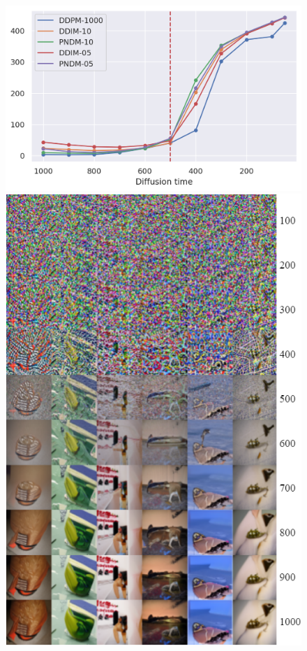 \documentclass{article}
\begin{document}
\begin{figure}[ht!]
\begin{minipage}[b]{.34\textwidth}
\begin{minipage}[b]{\textwidth}
  \end{minipage} \vfill
  \begin{minipage}[b]{\textwidth}
    \centering
    \includegraphics[width=\textwidth]{figs/plots/celeba64_late_starts_.png}
  \end{minipage}
\end{minipage}%
\begin{minipage}[b]{.298\textwidth}
  \includegraphics[width=\textwidth]{figs/imgs/imagenet64_late_starts_short__.png}\vspace{.3\baselineskip}

\end{minipage}
\end{figure}
\end{document}
